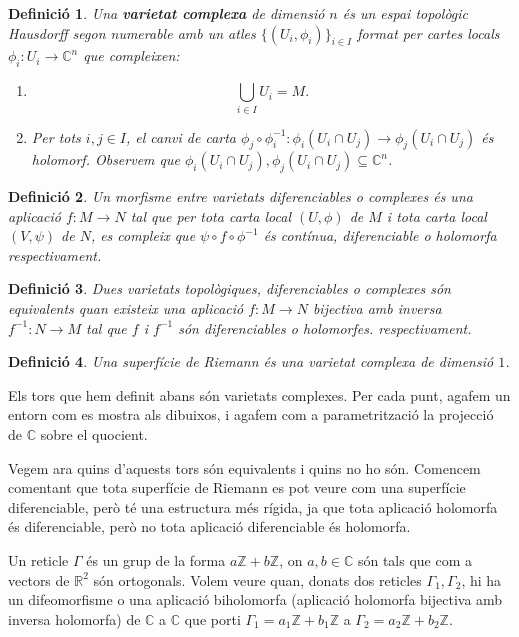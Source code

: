 \documentclass{article}
\newtheorem{definicio}{Definici\'{o}}
\theoremstyle{definition}
\begin{document}
\begin{definicio}
Una \textbf{varietat complexa} de dimensi\'{o} $n$ \'{e}s un espai topol\`{o}gic Hausdorff segon numerable amb un atles $\{(U_i,\phi_i)\}_{i\in I}$ format per cartes locals $\phi_i:U_i\rightarrow\mathbb{C}^n$ que compleixen:
\begin{enumerate}
\item \[\bigcup_{i\in I}U_i=M.\]
\item Per tots $i,j\in I$, el canvi de carta $\phi_j\circ\phi_i^{-1}:\phi_i(U_i\cap U_j)\rightarrow\phi_j(U_i\cap U_j)$ \'{e}s holomorf. Observem que $\phi_i(U_i\cap U_j),\phi_j(U_i\cap U_j)\subseteq\mathbb{C}^n$.
\end{enumerate}
\end{definicio}

\begin{definicio}
Un morfisme entre varietats diferenciables o complexes \'{e}s una aplicaci\'{o} $f:M\rightarrow N$ tal que per tota carta local $(U,\phi)$ de $M$ i tota carta local $(V,\psi)$ de $N$, es compleix que $\psi\circ f\circ\phi^{-1}$ \'{e}s cont\'{i}nua, diferenciable o holomorfa respectivament.
\end{definicio}

\begin{definicio}
Dues varietats topol\`{o}giques, diferenciables o complexes s\'{o}n equivalents quan existeix una aplicaci\'{o} $f:M\rightarrow N$ bijectiva amb inversa $f^{-1}:N\rightarrow M$ tal que $f$ i $f^{-1}$ s\'{o}n diferenciables o holomorfes. respectivament.
\end{definicio}

\begin{definicio}
Una superf\'{i}cie de Riemann \'{e}s una varietat complexa de dimensi\'{o} $1$.
\end{definicio}

Els tors que hem definit abans s\'{o}n varietats complexes. Per cada punt, agafem un entorn com es mostra als dibuixos, i agafem com a parametritzaci\'{o} la projecci\'{o} de $\mathbb{C}$ sobre el quocient.

Vegem ara quins d'aquests tors s\'{o}n equivalents i quins no ho s\'{o}n. Comencem comentant que tota superf\'{i}cie de Riemann es pot veure com una superf\'{i}cie diferenciable, per\`{o} t\'{e} una estructura m\'{e}s r\'{i}gida, ja que tota aplicaci\'{o} holomorfa \'{e}s diferenciable, per\`{o} no tota aplicaci\'{o} diferenciable \'{e}s holomorfa.

Un reticle $\Gamma$ \'{e}s un grup de la forma $a\mathbb{Z}+b\mathbb{Z}$, on $a,b\in\mathbb{C}$ s\'{o}n tals que com a vectors de $\mathbb{R}^2$ s\'{o}n ortogonals. Volem veure quan, donats dos reticles $\Gamma_1,\Gamma_2$, hi ha un difeomorfisme o una aplicaci\'{o} biholomorfa (aplicaci\'{o} holomorfa bijectiva amb inversa holomorfa) de $\mathbb{C}$ a $\mathbb{C}$ que porti $\Gamma_1=a_1\mathbb{Z}+b_1\mathbb{Z}$ a $\Gamma_2=a_2\mathbb{Z}+b_2\mathbb{Z}$.
\end{document}
